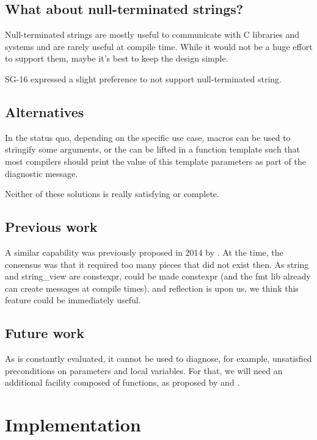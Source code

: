 \documentclass{wg21}
\begin{document}
\subsection{What about null-terminated strings?}

Null-terminated strings are mostly useful to communicate with C libraries and systems and are rarely useful at compile time.
While it would not be a huge effort to support them, maybe it's best to keep the design simple.

SG-16 expressed a slight preference to not support null-terminated string.

\subsection{Alternatives}

In the status quo, depending on the specific use case, macros can be used to stringify some arguments, or
the  can be lifted in a function template such that most compilers should print the value
of this template parameters as part of the diagnostic message.

Neither of these solutions is really satisfying or complete.

\subsection{Previous work}

A similar capability was previously proposed in 2014 by .
At the time, the consensus was that it required too many pieces that did not exist then.
As string and string_view are constexpr,  could be made constexpr (and the fmt lib already can create messages at compile times), and reflection is upon us,
we think this feature could be immediately useful.

\subsection{Future work}

As  is constantly evaluated, it cannot be used to diagnose, for example, unsatisfied preconditions on parameters and local variables.
For that, we will need an additional facility composed of  functions, as proposed by  and .

\section{Implementation}
\end{document}
